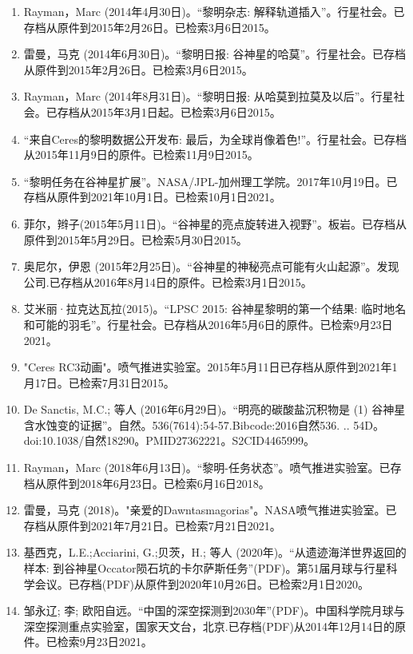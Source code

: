 \begin{enumerate}
\item Rayman，Marc (2014年4月30日)。“黎明杂志: 解释轨道插入”。行星社会。已存档从原件到2015年2月26日。已检索3月6日2015。
\item 雷曼，马克 (2014年6月30日)。“黎明日报: 谷神星的哈莫”。行星社会。已存档从原件到2015年2月26日。已检索3月6日2015。
\item Rayman，Marc (2014年8月31日)。“黎明日报: 从哈莫到拉莫及以后”。行星社会。已存档从2015年3月1日起。已检索3月6日2015。
\item “来自Ceres的黎明数据公开发布: 最后，为全球肖像着色!”。行星社会。已存档从2015年11月9日的原件。已检索11月9日2015。
\item “黎明任务在谷神星扩展”。NASA/JPL-加州理工学院。2017年10月19日。已存档从原件到2021年10月1日。已检索10月1日2021。
\item 菲尔，辫子(2015年5月11日)。“谷神星的亮点旋转进入视野”。板岩。已存档从原件到2015年5月29日。已检索5月30日2015。
\item 奥尼尔，伊恩 (2015年2月25日)。“谷神星的神秘亮点可能有火山起源”。发现公司.已存档从2016年8月14日的原件。已检索3月1日2015。
\item 艾米丽·拉克达瓦拉(2015)。“LPSC 2015: 谷神星黎明的第一个结果: 临时地名和可能的羽毛”。行星社会。已存档从2016年5月6日的原件。已检索9月23日2021。
\item "Ceres RC3动画"。喷气推进实验室。2015年5月11日已存档从原件到2021年1月17日。已检索7月31日2015。
\item De Sanctis, M.C.; 等人 (2016年6月29日)。“明亮的碳酸盐沉积物是 (1) 谷神星含水蚀变的证据”。自然。536(7614):54-57.Bibcode:2016自然536. .. 54D。doi:10.1038/自然18290。PMID27362221。S2CID4465999。  
\item Rayman，Marc (2018年6月13日)。“黎明-任务状态”。喷气推进实验室。已存档从原件到2018年6月23日。已检索6月16日2018。
\item  雷曼，马克 (2018)。"亲爱的Dawntasmagorias"。NASA喷气推进实验室。已存档从原件到2021年7月21日。已检索7月21日2021。
\item 基西克，L.E.;Acciarini, G.;贝茨，H.; 等人 (2020年)。“从遗迹海洋世界返回的样本: 到谷神星Occator陨石坑的卡尔萨斯任务”(PDF)。第51届月球与行星科学会议。已存档(PDF)从原件到2020年10月26日。已检索2月1日2020。
\item 邹永辽; 李; 欧阳自远。“中国的深空探测到2030年”(PDF)。中国科学院月球与深空探测重点实验室，国家天文台，北京.已存档(PDF)从2014年12月14日的原件。已检索9月23日2021。
\end{enumerate}
